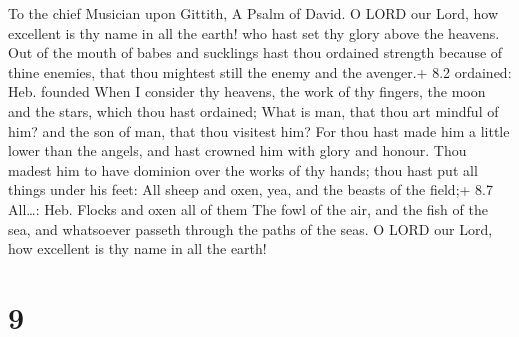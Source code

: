 To the chief Musician upon Gittith, A Psalm of David.  O
LORD our Lord, how excellent is thy name in all the earth! who hast set
thy glory above the heavens.  Out of the mouth of babes and
sucklings hast thou ordained strength because of thine enemies, that
thou mightest still the enemy and the avenger.+ 8.2 ordained: Heb.
founded  When I consider thy heavens, the work of thy
fingers, the moon and the stars, which thou hast ordained; 
What is man, that thou art mindful of him? and the son of man, that thou
visitest him?  For thou hast made him a little lower than
the angels, and hast crowned him with glory and honour. 
Thou madest him to have dominion over the works of thy hands; thou hast
put all things under his feet:  All sheep and oxen, yea, and
the beasts of the field;+ 8.7 All\ldots: Heb. Flocks and oxen all of
them  The fowl of the air, and the fish of the sea, and
whatsoever passeth through the paths of the seas.  O LORD
our Lord, how excellent is thy name in all the earth!

\hypertarget{section-8}{%
\section{9}\label{section-8}}

